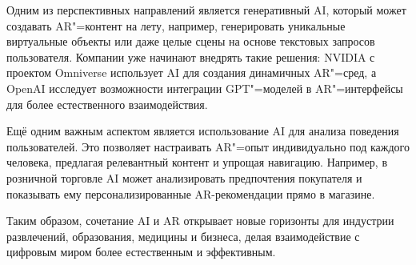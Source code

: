 Одним из перспективных направлений является генеративный AI, который может создавать AR"=контент на лету, например, генерировать уникальные виртуальные объекты или даже целые сцены на основе текстовых запросов пользователя. Компании уже начинают внедрять такие решения: NVIDIA с проектом Omniverse использует AI для создания динамичных AR"=сред, а OpenAI исследует возможности интеграции GPT"=моделей в AR"=интерфейсы для более естественного взаимодействия.

Ещё одним важным аспектом является использование AI для анализа поведения пользователей. Это позволяет настраивать AR"=опыт индивидуально под каждого человека, предлагая релевантный контент и упрощая навигацию. Например, в розничной торговле AI может анализировать предпочтения покупателя и показывать ему персонализированные AR-рекомендации прямо в магазине.

Таким образом, сочетание AI и AR открывает новые горизонты для индустрии развлечений, образования, медицины и бизнеса, делая взаимодействие с цифровым миром более естественным и эффективным.
